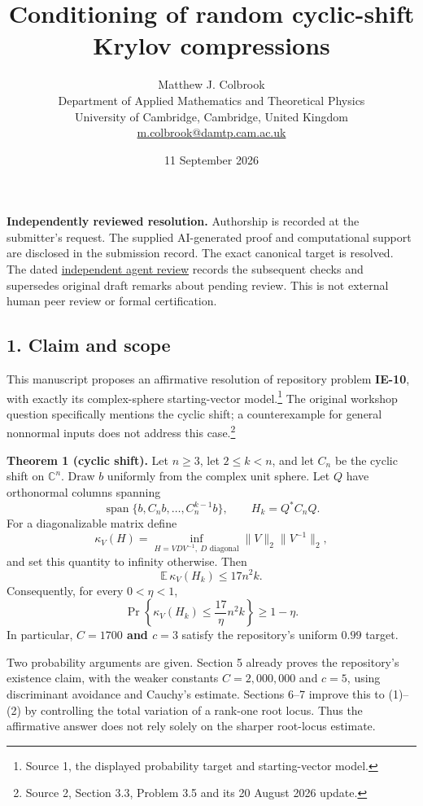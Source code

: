 \documentclass[
  11pt,
]{article}
\title{Conditioning of random cyclic-shift Krylov compressions}
\author{Matthew J. Colbrook\\\small Department of Applied Mathematics and Theoretical Physics\\\small University of Cambridge, Cambridge, United Kingdom\\\small\href{mailto:m.colbrook@damtp.cam.ac.uk}{m.colbrook@damtp.cam.ac.uk}}
\date{11 September 2026}
\begin{document}
\maketitle

\noindent\textbf{Independently reviewed resolution.} Authorship is recorded at the submitter's request. The supplied AI-generated proof and computational support are disclosed in the submission record. The exact canonical target is resolved.
The dated \href{https://github.com/MColbrook/OpenProblemsInNLA/blob/codex/colbrook-round3-submissions/references/colbrook-round3-2026-09-11/verification/reviews/IE-10-review.md}{independent agent review} records the subsequent checks and supersedes original draft remarks about pending review. This is not external human peer review or formal certification.
\par\medskip


\subsection{1. Claim and scope}\label{claim-and-scope}

This manuscript proposes an affirmative resolution of repository problem
\textbf{IE-10}, with exactly its complex-sphere starting-vector
model.\footnote{Source 1, the displayed probability target and
  starting-vector model.} The original workshop question specifically
mentions the cyclic shift; a counterexample for general nonnormal inputs
does not address this case.\footnote{Source 2, Section 3.3, Problem 3.5
  and its 20 August 2026 update.}

\textbf{Theorem 1 (cyclic shift).} Let \(n\geq3\), let \(2\leq k<n\),
and let \(C_n\) be the cyclic shift on \(\mathbb C^n\). Draw \(b\)
uniformly from the complex unit sphere. Let \(Q\) have orthonormal
columns spanning \[
\operatorname{span}\{b,C_nb,\ldots,C_n^{k-1}b\},
\qquad H_k=Q^*C_nQ.
\] For a diagonalizable matrix define \[
\kappa_V(H)=\inf_{H=VDV^{-1},\ D\text{ diagonal}}\|V\|_2\|V^{-1}\|_2,
\] and set this quantity to infinity otherwise. Then \[
\mathbb E\,\kappa_V(H_k)\leq17n^2k. \tag{1}
\] Consequently, for every \(0<\eta<1\), \[
\Pr\left\{\kappa_V(H_k)\leq\frac{17}{\eta}n^2k\right\}\geq1-\eta. \tag{2}
\] In particular, \textbf{\(C=1700\) and \(c=3\)} satisfy the
repository's uniform \(0.99\) target.

Two probability arguments are given. Section 5 already proves the
repository's existence claim, with the weaker constants
\(C=2{,}000{,}000\) and \(c=5\), using discriminant avoidance and
Cauchy's estimate. Sections 6--7 improve this to (1)--(2) by controlling
the total variation of a rank-one root locus. Thus the affirmative
answer does not rely solely on the sharper root-locus estimate.
\end{document}
